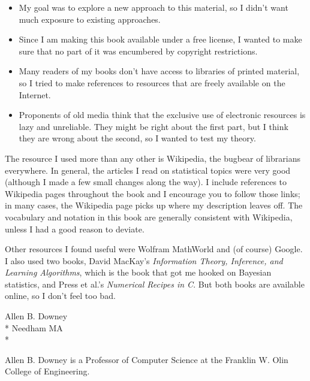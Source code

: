\documentclass[12pt]{book}
\begin{document}
\begin{itemize}

\item My goal was to explore a new approach to this material, so I didn't
want much exposure to existing approaches.

\item Since I am making this book available under a free license, I wanted
to make sure that no part of it was encumbered by copyright restrictions.

\item Many readers of my books don't have access to libraries of
printed material, so I tried to make references to resources that are
freely available on the Internet.

\item Proponents of old media think that the exclusive
use of electronic resources is lazy and unreliable.  They might be right
about the first part, but I think they are wrong about the second, so
I wanted to test my theory.


\end{itemize}

The resource I used more than any other is Wikipedia, the bugbear
of librarians everywhere.  In general, the articles I read on
statistical topics were very good (although I made a few small changes
along the way).  I include references to Wikipedia pages throughout
the book and I encourage you to follow those links; in many cases, the
Wikipedia page picks up where my description leaves off.  The
vocabulary and notation in this book are generally consistent with
Wikipedia, unless I had a good reason to deviate.

Other resources I found useful were Wolfram MathWorld and (of course)
Google.  I also used two books, David MacKay's {\em Information
  Theory, Inference, and Learning Algorithms}, which is the book that
got me hooked on Bayesian statistics, and Press et al.'s {\em
  Numerical Recipes in C}.  But both books are available online,
so I don't feel too bad.

Allen B. Downey \\*
Needham MA \\*

Allen B. Downey is a Professor of Computer Science at 
the Franklin W. Olin College of Engineering.
\end{document}
